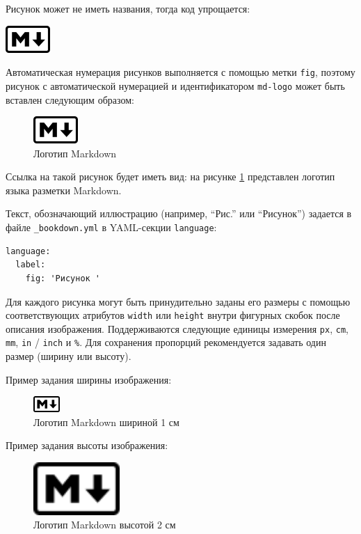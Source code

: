\documentclass[
  a4paper,
]{book}
\theoremstyle{definition}
\theoremstyle{definition}
\theoremstyle{definition}
\theoremstyle{definition}
\theoremstyle{remark}
\begin{document}
Рисунок может не иметь названия, тогда код упрощается:

\includegraphics{figures/Markdown-mark.png}

Автоматическая нумерация рисунков выполняется с помощью метки \texttt{fig}, поэтому рисунок с автоматической нумерацией и идентификатором \texttt{md-logo} может быть вставлен следующим образом:

\begin{figure}
\centering
\includegraphics{figures/Markdown-mark.png}
\caption{\label{fig:md-logo} Логотип Markdown}
\end{figure}

Ссылка на такой рисунок будет иметь вид: на рисунке \ref{fig:md-logo} представлен логотип языка разметки Markdown.

Текст, обозначающий иллюстрацию (например, ``Рис.'' или ``Рисунок'') задается в файле \texttt{\_bookdown.yml} в YAML-секции \texttt{language}:

\begin{verbatim}
language:
  label:
    fig: 'Рисунок '
\end{verbatim}

Для каждого рисунка могут быть принудительно заданы его размеры с помощью соответствующих атрибутов \texttt{width} или \texttt{height} внутри фигурных скобок после описания изображения. Поддерживаются следующие единицы измерения \texttt{px}, \texttt{cm}, \texttt{mm}, \texttt{in} / \texttt{inch} и \texttt{\%}. Для сохранения пропорций рекомендуется задавать один размер (ширину или высоту).

Пример задания ширины изображения:

\begin{figure}
\centering
\includegraphics[width=1cm,height=\textheight]{figures/Markdown-mark.png}
\caption{\label{fig:md-logo-w-1cm} Логотип Markdown шириной 1 см}
\end{figure}

Пример задания высоты изображения:

\begin{figure}
\centering
\includegraphics[width=\textwidth,height=2cm]{figures/Markdown-mark.png}
\caption{\label{fig:md-logo-h-2cm} Логотип Markdown высотой 2 см}
\end{figure}
\end{document}
